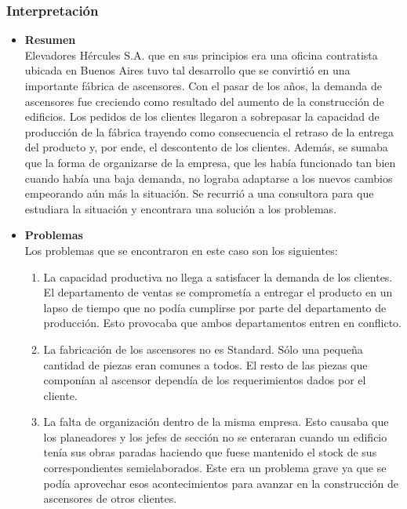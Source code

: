 \documentclass[a4paper,10pt,titlepage]{article}
\begin{document}
\subsubsection{Interpretaci\'on}

\begin{itemize}
 \item \textbf{Resumen}\\
      Elevadores H\'ercules S.A. que en sus principios era una oficina contratista ubicada en Buenos Aires tuvo tal desarrollo que se convirti\'o 
      en una importante f\'abrica de ascensores. Con el pasar de los a\~nos, la demanda de ascensores fue creciendo como resultado del aumento de 
      la construcci\'on de edificios. Los pedidos de los clientes llegaron a sobrepasar la capacidad de producci\'on de la f\'abrica trayendo como 
      consecuencia el retraso de la entrega del producto y, por ende, el descontento de los clientes. Adem\'as, se sumaba que la forma de 
      organizarse de la empresa, que les hab\'ia funcionado tan bien cuando hab\'ia una baja demanda, no lograba adaptarse a los nuevos cambios
      empeorando a\'un m\'as la situaci\'on. Se recurri\'o a una consultora para que estudiara la situaci\'on y encontrara una soluci\'on a los problemas.
 \item \textbf{Problemas}\\
      Los problemas que se encontraron en este caso son los siguientes:
      \begin{enumerate}
	\item La capacidad productiva no llega a satisfacer la demanda de los clientes. El departamento de ventas se compromet\'ia a entregar el 
	producto en un lapso de tiempo que no pod\'ia cumplirse por parte del departamento de producci\'on. Esto provocaba que ambos departamentos
	entren en conflicto.
	\item La fabricaci\'on de los ascensores no es Standard. S\'olo una peque\~na cantidad de piezas eran comunes a todos. El resto de las piezas 
	que compon\'ian al ascensor depend\'ia de los requerimientos dados por el cliente.
	\item La falta de organizaci\'on dentro de la misma empresa. Esto causaba que los planeadores y los jefes de secci\'on no se enteraran cuando 
	un edificio ten\'ia sus obras paradas haciendo que fuese mantenido el stock de sus correspondientes semielaborados. Este era un problema grave 
	ya que se pod\'ia aprovechar esos acontecimientos para avanzar en la construcci\'on de ascensores de otros clientes.
      \end{enumerate}

\end{itemize}
\end{document}
